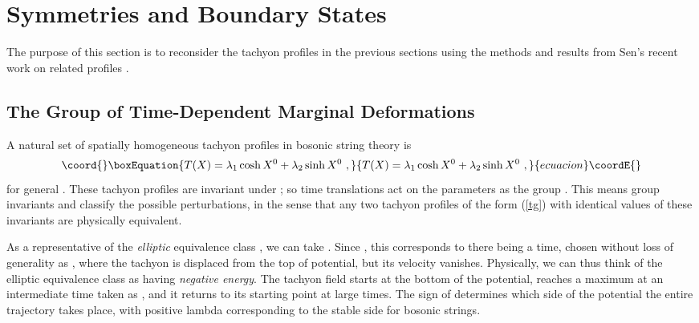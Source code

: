 \documentclass[a4paper,12pt]{article}
\begin{document}
\section{Symmetries and  Boundary States}
\label{boundary}
The purpose of this section is to reconsider the tachyon profiles in the previous 
sections using the methods and results from Sen's recent work on related 
profiles \cite{Sen1}.

\subsection{The Group of Time-Dependent Marginal Deformations}
A natural set of spatially homogeneous tachyon profiles in bosonic string theory 
is 
\begin{equation}\coord{}\boxEquation{
T(X)= \lambda_1 \cosh X^0+\lambda_2 \sinh X^0~,
\label{tg}
}{
T(X)= \lambda_1 \cosh X^0+\lambda_2 \sinh X^0~,
}{ecuacion}\coordE{}\end{equation}
for general \coordHE{}. These tachyon profiles are invariant under 
\coordHE{};
so time translations act on the parameters \coordHE{} as the 
group \coordHE{}. This means group invariants \coordHE{} and 
\coordHE{} classify the possible perturbations, in the
sense that any two 
tachyon profiles of the form (\ref{tg}) with identical values of these invariants are 
physically equivalent.

As a representative of the {\it elliptic} equivalence class \coordHE{}, 
we can take \coordHE{}. Since 
\coordHE{}, \coordHE{} this corresponds to there being
a time, chosen without loss of generality as \coordHE{}, where the tachyon is displaced 
from the top of potential, but its velocity vanishes. Physically, we can thus think of the
elliptic equivalence class as having {\it negative energy}. The tachyon field starts
at the bottom of the potential, reaches a maximum at an intermediate time taken as \coordHE{}, 
and it returns to its starting point at large times.  The sign of \coordHE{} 
determines  which side of the potential the entire trajectory takes place, with 
positive lambda corresponding to the stable side for bosonic strings. 
\end{document}
